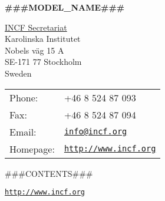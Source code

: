 \documentclass[a4paper]{article}
\def\name{###MODEL_NAME###}
\def\footerlink{http://www.incf.org}
\begin{document}

\centerline{\huge \bf \name}

\vspace{0.25in}

\begin{minipage}{0.45\linewidth}
  \href{http://www.incf.org}{INCF Secretariat} \\
  Karolinska Institutet \\
  Nobels väg 15 A \\
  SE-171 77 Stockholm \\
  Sweden
\end{minipage}
\begin{minipage}{0.45\linewidth}
  \begin{tabular}{ll}
    Phone: & +46 8 524 87 093 \\
    Fax: & +46 8 524 87 094 \\
    Email: & \href{mailto:info@incf.org}{\tt info@incf.org} \\
    Homepage: & \href{http://www.incf.org}{\tt http://www.incf.org} \\
  \end{tabular}
\end{minipage}

###CONTENTS###

\bigskip

\begin{center}
  \begin{footnotesize}
    \href{\footerlink}{\texttt{\footerlink}}
  \end{footnotesize}
\end{center}
\end{document}
